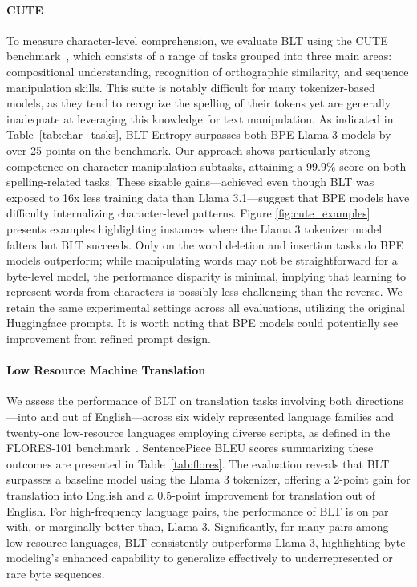 \paragraph{CUTE}
To measure character-level comprehension, we evaluate {\textsc BLT} using the CUTE benchmark~\citep{edman2024cute}, which consists of a range of tasks grouped into three main areas: compositional understanding, recognition of orthographic similarity, and sequence manipulation skills. This suite is notably difficult for many tokenizer-based models, as they tend to recognize the spelling of their tokens yet are generally inadequate at leveraging this knowledge for text manipulation. As indicated in Table~\ref{tab:char_tasks}, {\textsc BLT}-Entropy surpasses both BPE Llama 3 models by over 25 points on the benchmark. Our approach shows particularly strong competence on character manipulation subtasks, attaining a 99.9\% score on both spelling-related tasks. These sizable gains—achieved even though {\textsc BLT} was exposed to 16x less training data than Llama 3.1—suggest that BPE models have difficulty internalizing character-level patterns. Figure \ref{fig:cute_examples} presents examples highlighting instances where the Llama 3 tokenizer model falters but {\textsc BLT} succeeds. Only on the word deletion and insertion tasks do BPE models outperform; while manipulating words may not be straightforward for a byte-level model, the performance disparity is minimal, implying that learning to represent words from characters is possibly less challenging than the reverse. We retain the same experimental settings across all evaluations, utilizing the original Huggingface prompts. It is worth noting that BPE models could potentially see improvement from refined prompt design.

\paragraph{Low Resource Machine Translation} We assess the performance of {\textsc BLT} on translation tasks involving both directions—into and out of English—across six widely represented language families and twenty-one low-resource languages employing diverse scripts, as defined in the FLORES-101 benchmark~\citep{goyal2022flores}. SentencePiece BLEU scores summarizing these outcomes are presented in Table~\ref{tab:flores}. The evaluation reveals that {\textsc BLT} surpasses a baseline model using the Llama 3 tokenizer, offering a 2-point gain for translation into English and a 0.5-point improvement for translation out of English. For high-frequency language pairs, the performance of {\textsc BLT} is on par with, or marginally better than, Llama 3. Significantly, for many pairs among low-resource languages, {\textsc BLT} consistently outperforms Llama 3, highlighting byte modeling's enhanced capability to generalize effectively to underrepresented or rare byte sequences.

